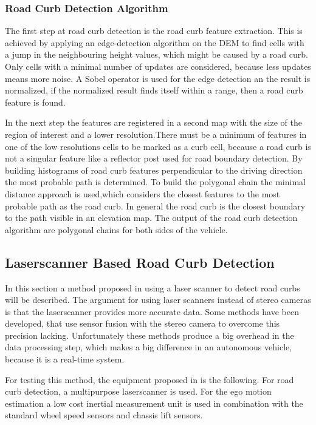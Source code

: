 \documentclass[conference]{IEEEtran}
\begin{document}
\subsubsection{Road Curb Detection Algorithm}

The first step at road curb detection is the road curb feature extraction. This is achieved by applying an edge-detection algorithm on the DEM to find cells with a jump in the neighbouring height values, which might be caused by a road curb. Only cells with a minimal number of updates are considered, because less updates means more noise. A Sobel operator is used for the edge detection an the result is normalized, if the normalized result finds itself within a range, then a road curb feature is found.

In the next step the features are registered in a second map with the size of the region of interest and a lower resolution.There must be a minimum of features in one of the low resolutions cells to be marked as a curb cell, because a road curb is not a singular feature like a reflector post used for road boundary detection. By building histograms of road curb features perpendicular to the driving direction the most probable path is determined. To build the polygonal chain the minimal distance approach is used,which considers the closest features to the most probable path as the road curb. In general the road curb is the closest boundary to the path visible in an elevation map. The output of the road curb detection algorithm are polygonal chains for both sides of the vehicle.


\subsection{Laserscanner Based Road Curb Detection}

In this section a method proposed in \cite{stereo} using a laser scanner to detect road curbs will be described. The argument for using laser scanners instead of stereo cameras is that the laserscanner provides more accurate data. Some methods have been developed, that use sensor fusion with the stereo camera to overcome this precision lacking. Unfortunately these methods produce a big overhead in the data processing step, which makes a big difference in an autonomous vehicle, because it is a real-time system.

For testing this method, the equipment proposed in \cite{stereo} is the following. For road curb detection, a multipurpose laserscanner is used. For the ego motion estimation a low cost inertial measurement unit is used in combination with the standard wheel speed sensors and chassis lift sensors. 
\end{document}
